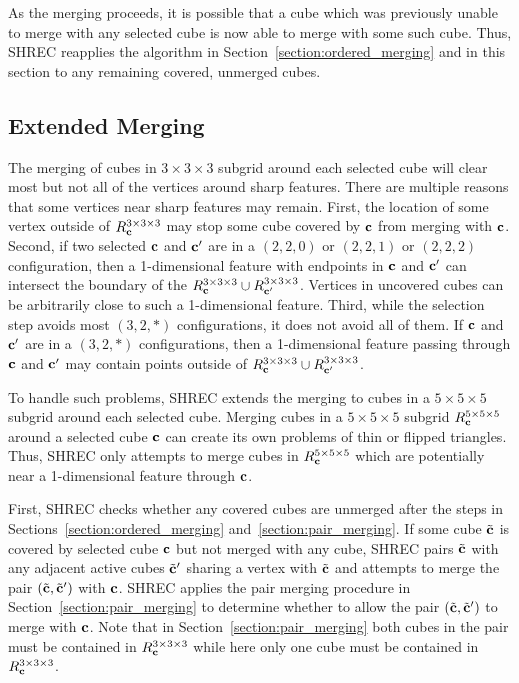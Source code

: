 As the merging proceeds,
it is possible that a cube which was previously unable 
to merge with any selected cube
is now able to merge with some such cube.
Thus, SHREC reapplies the algorithm in Section~\ref{section:ordered_merging}
and in this section to any remaining covered, unmerged cubes.


\subsection{Extended Merging}
\label{section:extended_merging}

The merging of cubes in $3 \times 3 \times 3$ subgrid
around each selected cube will clear most but not all of the vertices 
around sharp features.
There are multiple reasons that some vertices 
near sharp features may remain.
First, the location of some vertex outside of $R^{3 \times 3 \times 3}_{\mathbf{c}}$
may stop some cube covered by $\mathbf{c}$ from merging with $\mathbf{c}$.
Second, if two selected $\mathbf{c}$ and $\mathbf{c}'$ are 
in a $(2,2,0)$ or $(2,2,1)$ or $(2,2,2)$ configuration, 
then a 1-dimensional feature with endpoints in $\mathbf{c}$ and $\mathbf{c}'$ can intersect
the boundary of the $R^{3 \times 3 \times 3}_{\mathbf{c}} \cup R^{3 \times 3 \times 3}_{\mathbf{c}'}$.
Vertices in uncovered cubes can be arbitrarily close 
to such a 1-dimensional feature.
Third, while the selection step avoids most $(3,2,*)$ configurations,
it does not avoid all of them.
If $\mathbf{c}$ and $\mathbf{c}'$ are in a $(3,2,*)$ configurations,
then a 1-dimensional feature passing through $\mathbf{c}$ and $\mathbf{c}'$ 
may contain points outside of $R^{3 \times 3 \times 3}_{\mathbf{c}} \cup R^{3 \times 3 \times 3}_{\mathbf{c}'}$.

To handle such problems, SHREC extends the merging to cubes
in a $5 \times 5 \times 5$ subgrid around each selected cube.
Merging cubes in a $5 \times 5 \times 5$ subgrid $R^{5 \times 5 \times 5}_{\mathbf{c}}$
around a selected cube $\mathbf{c}$ can create its own problems 
of thin or flipped triangles.
Thus, SHREC only attempts to merge cubes in $R^{5 \times 5 \times 5}_{\mathbf{c}}$
which are potentially near a 1-dimensional feature through $\mathbf{c}$.

First, SHREC checks whether any covered cubes are unmerged
after the steps in Sections~\ref{section:ordered_merging}
and~\ref{section:pair_merging}.
If some cube ${\tilde{\mathbf{c}}}$ is covered by selected cube $\mathbf{c}$
but not merged with any cube,
SHREC pairs ${\tilde{\mathbf{c}}}$ with any adjacent active cubes ${\tilde{\mathbf{c}}}'$
sharing a vertex with ${\tilde{\mathbf{c}}}$
and attempts to merge the pair $({\tilde{\mathbf{c}}},{\tilde{\mathbf{c}}}')$ with $\mathbf{c}$.
SHREC applies the pair merging procedure
in Section~\ref{section:pair_merging} to determine whether
to allow the pair $({\tilde{\mathbf{c}}},{\tilde{\mathbf{c}}}')$ to merge with $\mathbf{c}$.
Note that in Section~\ref{section:pair_merging} both cubes in the pair
must be contained in $R^{3 \times 3 \times 3}_{\mathbf{c}}$ while here only one cube
must be contained in $R^{3 \times 3 \times 3}_{\mathbf{c}}$.

